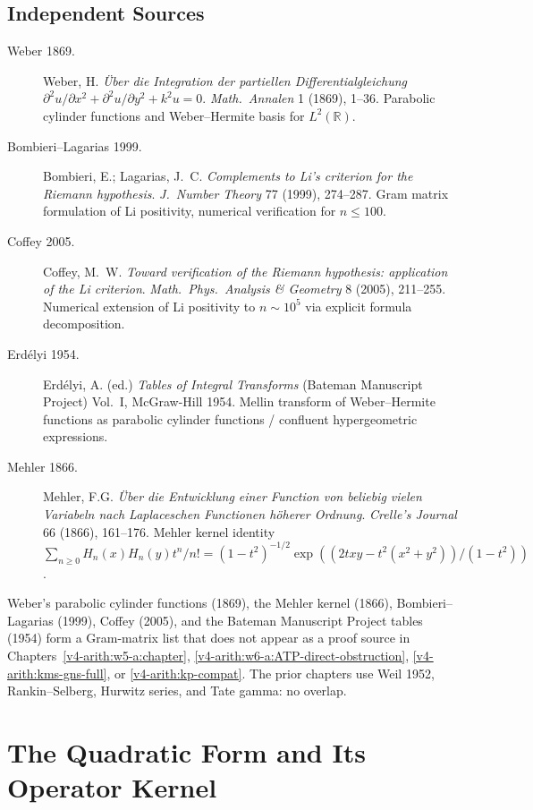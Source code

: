 \subsection{Independent Sources}
\label{v4-arith:w7-h:sources}

\begin{description}
\item[Weber 1869.] Weber, H. \emph{\"Uber die Integration der
partiellen Differentialgleichung
\(\partial^{2}u/\partial x^{2}+\partial^{2}u/\partial y^{2}+k^{2}u=0\)}.
\emph{Math.~Annalen} 1 (1869), 1--36. Parabolic cylinder functions
and Weber--Hermite basis for \(L^{2}(\mathbb{R})\).
\item[Bombieri--Lagarias 1999.] Bombieri, E.; Lagarias, J.~C.
\emph{Complements to Li's criterion for the Riemann hypothesis}.
\emph{J.~Number Theory} 77 (1999), 274--287.
Gram matrix formulation of Li positivity, numerical verification
for \(n\leq 100\).
\item[Coffey 2005.] Coffey, M.~W. \emph{Toward verification of the
Riemann hypothesis: application of the Li criterion}.
\emph{Math.~Phys.~Analysis \& Geometry} 8 (2005), 211--255.
Numerical extension of Li positivity to \(n\sim 10^{5}\) via explicit
formula decomposition.
\item[Erd\'elyi 1954.] Erd\'elyi, A. (ed.) \emph{Tables of Integral
Transforms} (Bateman Manuscript Project) Vol.~I, McGraw-Hill 1954.
Mellin transform of Weber--Hermite functions as parabolic cylinder
functions / confluent hypergeometric expressions.
\item[Mehler 1866.] Mehler, F.G. \emph{\"Uber die Entwicklung einer
Function von beliebig vielen Variabeln nach Laplaceschen Functionen
h\"oherer Ordnung}. \emph{Crelle's Journal} 66 (1866), 161--176.
Mehler kernel identity
\(\sum_{n\geq 0}H_{n}(x)H_{n}(y)t^{n}/n!=(1-t^{2})^{-1/2}\exp((2txy-t^{2}(x^{2}+y^{2}))/(1-t^{2}))\).
\end{description}

Weber's parabolic cylinder functions
(1869), the Mehler kernel (1866), Bombieri--Lagarias (1999),
Coffey (2005), and the Bateman Manuscript Project tables (1954) form
a Gram-matrix list that does not appear as a proof source in
Chapters~\ref{v4-arith:w5-a:chapter}, \ref{v4-arith:w6-a:ATP-direct-obstruction},
\ref{v4-arith:kms-gns-full}, or \ref{v4-arith:kp-compat}. The prior
chapters use Weil 1952, Rankin--Selberg, Hurwitz series, and Tate
gamma: no overlap.

\section{The Quadratic Form and Its Operator Kernel}
\label{v4-arith:w7-h:quadratic-form}

